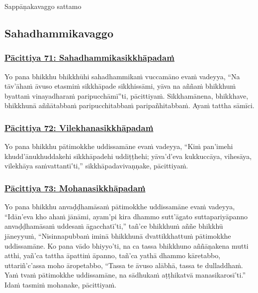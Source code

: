 \begin{center}
	Sappāṇakavaggo sattamo
\end{center}



\subsection{Sahadhammikavaggo}

\subsubsection*{\hyperref[exp71]{Pācittiya 71: Sahadhammikasikkhāpadaṁ}}
\label{pac71}

Yo pana bhikkhu bhikkhūhi sahadhammikaṁ vuccamāno evaṁ vadeyya, ``Na tāv'āhaṁ āvuso etasmiṁ sikkhāpade sikkhissāmi, yāva na aññaṁ bhikkhuṁ byattaṁ vinayadharaṁ paripucchāmī''ti, pācittiyaṁ. Sikkhamānena, bhikkhave, bhikkhunā aññātabbaṁ paripucchitabbaṁ paripañhitabbaṁ. Ayaṁ tattha sāmīci.



\subsubsection*{\hyperref[exp72]{Pācittiya 72: Vilekhanasikkhāpadaṁ}}
\label{pac72}

Yo pana bhikkhu pātimokkhe uddissamāne evaṁ vadeyya, ``Kiṁ pan'imehi khudd'ānukhuddakehi sikkhāpadehi uddiṭṭhehi; yāva'd'eva kukkuccāya, vihesāya, vilekhāya saṁvattantī'ti,'' sikkhāpadavivaṇṇake, pācittiyaṁ.



\subsubsection*{\hyperref[exp73]{Pācittiya 73: Mohanasikkhāpadaṁ}}
\label{pac73}

Yo pana bhikkhu anvaḍḍhamāsaṁ pātimokkhe uddissamāne evaṁ vadeyya, ``Idān'eva kho ahaṁ jānāmi, ayam'pi kira dhammo sutt'āgato suttapariyāpanno anvaḍḍhamāsaṁ uddesaṁ āgacchatī'ti,'' tañ'ce bhikkhuṁ aññe bhikkhū jāneyyuṁ, ``Nisinnapubbaṁ iminā bhikkhunā dvattikkhattuṁ pātimokkhe uddissamāne. Ko pana vādo bhiyyo'ti, na ca tassa bhikkhuno aññāṇakena mutti atthi, yañ'ca tattha āpattiṁ āpanno, tañ'ca yathā dhammo kāretabbo, uttariñ'c'assa moho āropetabbo, ``Tassa te āvuso alābhā, tassa te dulladdhaṁ. Yaṁ tvaṁ pātimokkhe uddissamāne, na sādhukaṁ aṭṭhikatvā manasikarosī'ti.'' Idaṁ tasmiṁ mohanake, pācittiyaṁ.



